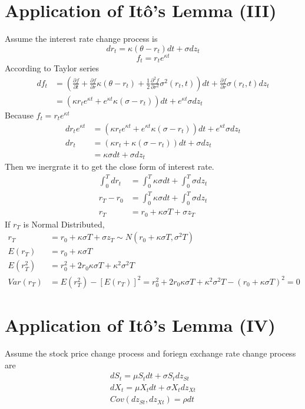 \documentclass[12pt]{article}
\begin{document}
\section{Application of It\^o's Lemma (III)}
Assume the interest rate change process is
\[
    dr_t = \kappa(\theta - r_t)dt + \sigma dz_t
\]
\[
    f_t = r_t e^{\kappa t}
\]  
According to Taylor series
\begin{align*}
    df_t &= (\frac{\partial f}{\partial t} + \frac{\partial f}{\partial r}\kappa(\theta-r_t) + \frac{1}{2}\frac{\partial^2f}{\partial r^2}\sigma^2(r_t, t))dt + \frac{\partial f}{\partial r}\sigma(r_t, t)dz_t\\
    &= (\kappa r_t e^{\kappa t} + e^{\kappa t}\kappa (\sigma-r_t))dt + e^{\kappa t}\sigma dz_t
\end{align*}
Because $f_t = r_t e^{\kappa t}$
\begin{align*}
    dr_t e^{\kappa t} &= (\kappa r_t e^{\kappa t} + e^{\kappa t}\kappa (\sigma-r_t))dt + e^{\kappa t}\sigma dz_t\\
    dr_t &= (\kappa r_t + \kappa (\sigma-r_t))dt + \sigma dz_t\\
    &= \kappa\sigma dt + \sigma dz_t
\end{align*}
Then we inergrate it to get the close form of interest rate.
\begin{align*}
    \int_0^T dr_t &= \int_0^T \kappa\sigma dt + \int_0^T \sigma dz_t\\
    r_T -r_0 &= \int_0^T \kappa\sigma dt + \int_0^T \sigma dz_t\\
    r_T &= r_0 + \kappa\sigma T + \sigma z_T
\end{align*}
If $r_T$ is Normal Distributed,
\begin{align*}
    r_T &= r_0 + \kappa\sigma T + \sigma z_T\sim N(r_0 + \kappa\sigma T, \sigma^2 T)\\
    E(r_T) &= r_0 + \kappa\sigma T\\
    E(r_T^2) &= r_0^2 + 2r_0\kappa\sigma T + \kappa^2\sigma^2 T\\
    Var(r_T) &= E(r_T^2) - [E(r_T)]^2 = r_0^2 + 2r_0\kappa\sigma T + \kappa^2\sigma^2 T - (r_0 + \kappa\sigma T)^2 = 0
\end{align*}
\newpage
\section{Application of It\^o's Lemma (IV)}
Assume the stock price change process and foriegn exchange rate change process are
\begin{align*}
    dS_t = \mu S_t dt + \sigma S_t dz_{St}\\
    dX_t = \mu X_t dt + \sigma X_t dz_{Xt}\\
    Cov(dz_{St}, dz_{Xt}) = \rho dt
\end{align*}
\end{document}
